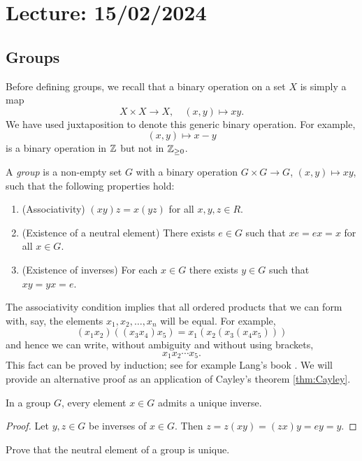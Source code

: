\section{Lecture: 15/02/2024}

\subsection{Groups}

Before defining groups, we recall that a binary operation on a set $X$
is simply a map 
\[
X\times X\to X,
\quad (x,y)\mapsto xy.
\]
We have used 
juxtaposition to denote this generic binary operation. For example,
\[
(x,y)\mapsto x-y
\]
is a binary operation in $\mathbb{Z}$ but not
in $\mathbb{Z}_{\geq 0}$.

\begin{definition}
A \emph{group} is a non-empty set $G$ with a binary operation
$G\times G\to G$, $(x,y)\mapsto xy$, such that
the following properties hold:
\begin{enumerate}
    \item (Associativity) $(xy)z=x(yz)$ for all $x,y,z\in R$.
    \item (Existence of a neutral element) There exists $e\in G$ such that $xe=ex=x$ for all $x\in G$.
    \item (Existence of inverses) For each $x\in G$ there exists $y\in G$ such that $xy=yx=e$.
\end{enumerate}
\end{definition}

The associativity condition implies
that all ordered products that we can form with, say, 
the elements $x_1,x_2,\dots,x_n$ will be equal. For example,
\[
(x_1x_2)((x_3x_4)x_5)=x_1(x_2(x_3(x_4x_5)))
\]
and hence we can write, without ambiguity and without using brackets, 
\[
x_1x_2\cdots x_5.
\]
This fact can be proved by induction; see for example
Lang's book \cite{MR783636}. We will provide an alternative proof as an application
of Cayley's theorem \ref{thm:Cayley}. 

\begin{proposition}
    In a group $G$, every element $x\in G$ admits a unique inverse.
\end{proposition}

\begin{proof}
    Let $y,z\in G$ be inverses of $x\in G$. Then 
    $z=z(xy)=(zx)y=ey=y$.
\end{proof}

\begin{exercise}
\label{xca:neutral}
    Prove that the neutral element of a group is unique. 
\end{exercise}

